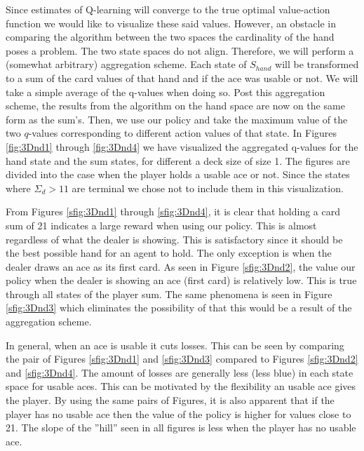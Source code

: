 Since estimates of Q-learning will converge to the true optimal value-action function we would like to visualize these said values. However, an obstacle in comparing the algorithm between the two spaces the cardinality of the hand poses a problem. The two state spaces do not align. Therefore, we will perform a (somewhat arbitrary) aggregation scheme. Each state of $S_{hand}$ will be transformed to a sum of the card values of that hand and if the ace was usable or not. We will take a simple average of the q-values when doing so. Post this aggregation scheme, the results from the algorithm on the hand space are now on the same form as the sum's. Then, we use our policy and take the maximum value of the two $q$-values corresponding to different action values of that state. In Figures \ref{fig:3Dnd1} through \ref{fig:3Dnd4} we have visualized the aggregated q-values for the hand state and the sum states, for different a deck size of size 1. The figures are divided into the case when the player holds a usable ace or not. Since the states where $\Sigma_d > 11$ are terminal we chose not to include them in this visualization.

From Figures  \ref{sfig:3Dnd1} through \ref{sfig:3Dnd4}, it is clear that holding a card sum of 21 indicates a large reward when using our policy. This is almost regardless of what the dealer is showing. This is satisfactory since it should be the best possible hand for an agent to hold.  The only exception is when the dealer draws an ace as its first card. As seen in Figure \ref{sfig:3Dnd2}, the value our policy when the dealer is showing an ace (first card) is relatively low. This is true through all states of the player sum. The same phenomena is seen in Figure \ref{sfig:3Dnd3} which eliminates the possibility of that this would be a result of the aggregation scheme. 

In general, when an ace is usable it cuts losses. This can be seen by comparing the pair of Figures \ref{sfig:3Dnd1} and \ref{sfig:3Dnd3} compared to Figures \ref{sfig:3Dnd2} and \ref{sfig:3Dnd4}. The amount of losses are generally less (less blue) in each state space for usable aces. This can be motivated by the flexibility an usable ace gives the player. By using the same pairs of Figures, it is also apparent that if the player has no usable ace then the value of the policy is higher for values close to 21. The slope of the ''hill'' seen in all figures is less when the player has no usable ace. 

